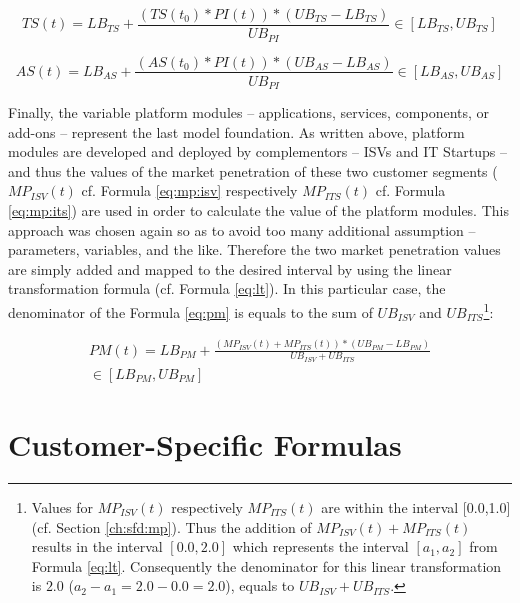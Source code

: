 \begin{equation}\label{eq:ts}
	TS(t) = LB_{TS} +  \frac{(TS(t_0) * PI(t)) * (UB_{TS} - LB_{TS})}{UB_{PI}} \in [LB_{TS},UB_{TS}]
\end{equation}

\begin{equation}\label{eq:as}
	AS(t) = LB_{AS} +  \frac{(AS(t_0) * PI(t)) * (UB_{AS} - LB_{AS})}{UB_{PI}} \in [LB_{AS},UB_{AS}]
\end{equation} 

Finally, the variable platform modules -- applications, services, components, or add-ons -- represent the last model foundation. As written above, platform modules are developed and deployed by complementors -- \acp{ISV} and \ac{IT} Startups -- and thus the values of the market penetration of these two customer segments ($MP_{ISV}(t)$ cf. Formula \ref{eq:mp:isv} respectively $MP_{ITS}(t)$ cf. Formula \ref{eq:mp:its}) are used in order to calculate the value of the platform modules. This approach was chosen again so as to avoid too many additional assumption -- parameters, variables, and the like. Therefore the two market penetration values are simply added and mapped to the desired interval by using the linear transformation formula (cf. Formula \ref{eq:lt}). In this particular case, the denominator of the Formula \ref{eq:pm} is equals to the sum of $UB_{ISV}$ and $UB_{ITS}$\footnote{Values for $MP_{ISV}(t)$ respectively $MP_{ITS}(t)$ are within the interval [0.0,1.0] (cf. Section \ref{ch:sfd:mp}). Thus the addition of $MP_{ISV}(t) + MP_{ITS}(t)$ results in the interval $[0.0,2.0]$ which represents the interval $[a_1,a_2]$ from Formula \ref{eq:lt}. Consequently the denominator for this linear transformation is $2.0$ ($a_2 - a_1 = 2.0 - 0.0 = 2.0$), equals to $UB_{ISV} + UB_{ITS}$.}:

\begin{eqnarray}\label{eq:pm}
	PM(t) = LB_{PM} + \frac{(MP_{ISV}(t) + MP_{ITS}(t)) * (UB_{PM} - LB_{PM})}{UB_{ISV} + UB_{ITS}} \nonumber \\ \in [LB_{PM},UB_{PM}]
\end{eqnarray}

\section{Customer-Specific Formulas}\label{ch:sfd:csf}

